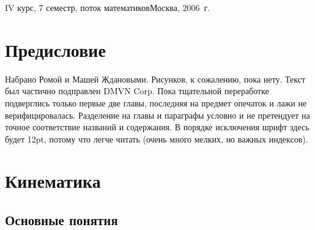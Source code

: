 \documentclass[a4paper,12pt]{article}
\begin{document}
{IV курс, 7 семестр, поток математиков}{Москва, 2006~г.}

\pagebreak

\tableofcontents


\section*{Предисловие}

Набрано Ромой и Машей Ждановыми. Рисунков, к сожалению, пока нету. Текст был частично подправлен DMVN Corp.
Пока тщательной переработке подверглись только первые две главы, последняя на предмет опечаток
и лажи не верифицировалась. Разделение на главы и параграфы условно и не претендует на точное соответствие
названий и содержания. В порядке исключения шрифт здесь будет 12pt, потому что легче читать
(очень много мелких, но важных индексов).

\medskip
\dmvntrail



\newpage


\section{Кинематика}

\subsection{Основные понятия}
\end{document}
